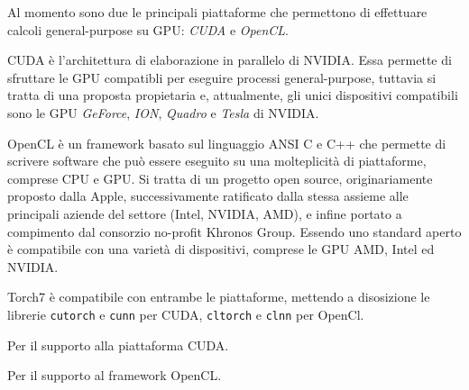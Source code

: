 Al momento sono due le principali piattaforme che permettono di effettuare calcoli general-purpose su GPU: \emph{CUDA} e \emph{OpenCL}.

CUDA \`e l'architettura di elaborazione in parallelo di NVIDIA.
Essa permette di sfruttare le GPU compatibli per eseguire processi general-purpose, tuttavia si tratta di una proposta propietaria e, attualmente, gli unici dispositivi compatibili sono le GPU \emph{GeForce}, \emph{ION}, \emph{Quadro} e \emph{Tesla} di NVIDIA.

OpenCL \`e un framework basato sul linguaggio ANSI C e C++ che permette di scrivere software che pu\`o essere eseguito su una molteplicit\`a di piattaforme, comprese CPU e GPU.
Si tratta di un progetto open source, originariamente proposto dalla Apple, successivamente ratificato dalla stessa assieme alle principali aziende del settore (Intel, NVIDIA, AMD), e infine portato a compimento dal consorzio no-profit Khronos Group.
Essendo uno standard aperto \`e compatibile con una variet\`a di dispositivi, comprese le GPU AMD, Intel ed NVIDIA.

Torch7 \`e compatibile con entrambe le piattaforme, mettendo a disosizione le librerie \texttt{cutorch} e \texttt{cunn} per CUDA, \texttt{cltorch} e \texttt{clnn} per OpenCl.



Per il supporto alla piattaforma CUDA.



Per il supporto al framework OpenCL.
